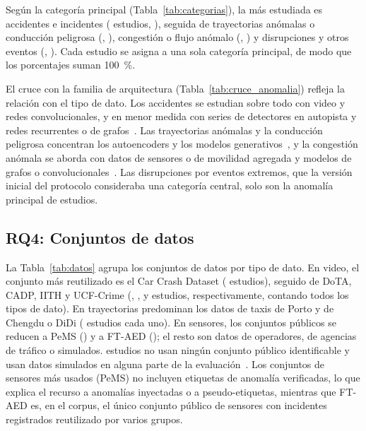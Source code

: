 \documentclass[12pt, a4paper]{article}
\begin{document}
Según la categoría principal (Tabla~\ref{tab:categorias}), la más estudiada es accidentes e incidentes (\NcatA{} estudios, \PcatA), seguida de trayectorias anómalas o conducción peligrosa (\NcatC, \PcatC), congestión o flujo anómalo (\NcatB, \PcatB) y disrupciones y otros eventos (\NcatD, \PcatD). Cada estudio se asigna a una sola categoría principal, de modo que los porcentajes suman 100~\%.



El cruce con la familia de arquitectura (Tabla~\ref{tab:cruce_anomalia}) refleja la relación con el tipo de dato. Los accidentes se estudian sobre todo con video y redes convolucionales, y en menor medida con series de detectores en autopista y redes recurrentes o de grafos~\cite{fang2020deep,shang2021hybrid,mehrannia2023deep,nouri2026early}. Las trayectorias anómalas y la conducción peligrosa concentran los autoencoders y los modelos generativos~\cite{chakraborty2023structural,zhang2023trajectory,wang2024multiscale}, y la congestión anómala se aborda con datos de sensores o de movilidad agregada y modelos de grafos o convolucionales~\cite{djenouri2022intelligent,zhang2022automatic,mao2024detecting,ren2024graph}. Las disrupciones por eventos extremos, que la versión inicial del protocolo consideraba una categoría central, solo son la anomalía principal de \NcatD{} estudios.



\subsection{RQ4: Conjuntos de datos}

La Tabla~\ref{tab:datos} agrupa los conjuntos de datos por tipo de dato. En video, el conjunto más reutilizado es el Car Crash Dataset (\NdsCCD{} estudios), seguido de DoTA, CADP, IITH y UCF-Crime (\NdsDoTA, \NdsCADP, \NdsIITH{} y \NdsUCF{} estudios, respectivamente, contando todos los tipos de dato). En trayectorias predominan los datos de taxis de Porto y de Chengdu o DiDi (\NdsPorto{} estudios cada uno). En sensores, los conjuntos públicos se reducen a PeMS (\NdsPeMS) y a FT-AED (\NdsFTAED); el resto son datos de operadores, de agencias de tráfico o simulados. \NsinDatasetPublico{} estudios no usan ningún conjunto público identificable y \NdatosSimuladosAny{} usan datos simulados en alguna parte de la evaluación~\cite{he2023autonomous,hu2023detecting,mbuya2025graph,park2025graph,zaitouny2026simulation}. Los conjuntos de sensores más usados (PeMS) no incluyen etiquetas de anomalía verificadas, lo que explica el recurso a anomalías inyectadas o a pseudo-etiquetas, mientras que FT-AED es, en el corpus, el único conjunto público de sensores con incidentes registrados reutilizado por varios grupos.
\end{document}

